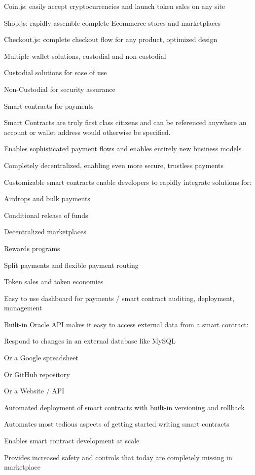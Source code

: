 \documentclass[11pt]{article}
\begin{document}
Coin.js: easily accept cryptocurrencies and launch token sales on any site


Shop.js: rapidly assemble complete Ecommerce stores and marketplaces


Checkout.js: complete checkout flow for any product, optimized design


Multiple wallet solutions, custodial and non-custodial


Custodial solutions for ease of use


Non-Custodial for security assurance


Smart contracts for payments


Smart Contracts are truly first class citizens and can be referenced anywhere an account or wallet address would otherwise be specified.


Enables sophisticated payment flows and enables entirely new business models


Completely decentralized, enabling even more secure, trustless payments


Customizable smart contracts enable developers to rapidly integrate solutions for:


Airdrops and bulk payments


Conditional release of funds


Decentralized marketplaces


Rewards programs


Split payments and flexible payment routing


Token sales and token economies


Easy to use dashboard for payments / smart contract auditing, deployment, management


Built-in Oracle API makes it easy to access external data from a smart contract:


Respond to changes in an external database like MySQL


Or a Google spreadsheet


Or GitHub repository


Or a Website / API


Automated deployment of smart contracts with built-in versioning and rollback


Automates most tedious aspects of getting started writing smart contracts


Enables smart contract development at scale


Provides increased safety and controls that today are completely missing in marketplace
\end{document}
